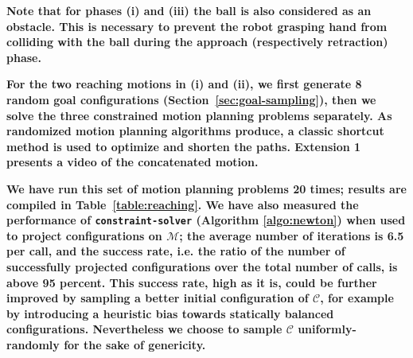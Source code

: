 \documentclass{article}
\newcommand\manifold{\mathcal{M}}
\begin{document}
\textbf{Note that for phases (i) and (iii) the ball is also considered
  as an obstacle. This is necessary to prevent the robot grasping hand
  from colliding with the ball during the approach (respectively
  retraction) phase.}

\textbf{For the two reaching motions in (i) and (ii), we first
  generate 8 random goal configurations
  (Section~\ref{sec:goal-sampling}), then we solve the three
  constrained motion planning problems separately. As randomized
  motion planning algorithms produce, a classic shortcut method is
  used to optimize and shorten the paths. Extension 1 presents a
  video of the concatenated motion.}

\textbf{We have run this set of motion planning problems 20 times;
  results are compiled in Table~\ref{table:reaching}. We have also
  measured the performance of \texttt{constraint-solver} (Algorithm
  \ref{algo:newton}) when used to project configurations on
  $\manifold$; the average number of iterations is 6.5 per call, and
  the success rate, i.e. the ratio of the number of successfully
  projected configurations over the total number of calls, is above 95
  percent. This success rate, high as it is, could be further improved
  by sampling a better initial configuration of $\mathcal{C}$, for
  example by introducing a heuristic bias towards statically balanced
  configurations. Nevertheless we choose to sample $\mathcal{C}$
  uniformly-randomly for the sake of genericity.}
\end{document}
